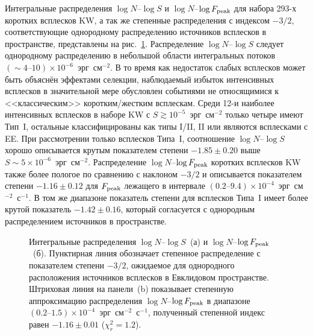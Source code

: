 Интегральные распределения $\log N$--$\log S$ и $\log N$--$\log F_{\mathrm{peak}}$
для набора 293-х коротких всплесков KW, а так же степенные распределения с индексом $-3/2$, 
соответствующие однородному распределению источников всплесков в пространстве,
представлены на рис.~\ref{fig:logNlogS_PF}.
Распределение $\log N$--$\log S$ следует однородному распределению в небольшой 
области интегральных потоков $(\sim 4\textrm{--}10)\times 10^{-6}$~эрг~см$^{-2}$.
В то время как недостаток слабых всплесков может быть объяснён эффектами селекции,
наблюдаемый избыток интенсивных всплесков в значительной мере обусловлен событиями 
не относящимися к <<классическим>> коротким/жестким всплескам. Среди 12-и наиболее 
интенсивных всплесков в наборе KW с $S \gtrsim 10^{-5}$~эрг~см$^{-2}$ только 
четыре имеют Тип~I, остальные классифицированы как типы I/II, II или являются всплесками с EE.
При рассмотрении только всплесков Типа~I, соотношение $\log N$--$\log S$ хорошо 
описывается крутым показателем степени $-1.85 \pm 0.20$ выше $S\sim 5\times 10^{-6}$~эрг~см$^{-2}$.
Распределение $\log N$--$\log F_{\mathrm{peak}}$ коротких всплесков KW также более пологое 
по сравнению с наклоном $-3/2$ и описывается показателем степени 
$-1.16 \pm 0.12$ для $F_{\mathrm{peak}}$ лежащего в интервале
$(0.2\textrm{--}9.4)\times 10^{-4}$~эрг~см$^{-2}$~с$^{-1}$.
В том же диапазоне показатель степени для всплесков Типа~I имеет более крутой показатель 
$-1.42 \pm 0.16$, который согласуется с однородным распределением источников в пространстве.

\begin{figure}
    \begin{minipage}[h]{0.5\textwidth}
    \end{minipage}
    \hfill
    \begin{minipage}[h]{0.5\textwidth}
	\end{minipage}
\caption{
    Интегральные распределения $\log N$--$\log S$~(а) и $\log N$--$\log F_{\mathrm{peak}}$~(б).
    Пунктирная линия обозначает степенное распределение с показателем степени $-3/2$,
    ожидаемое для однородного расположения источников всплесков в Евклидовом пространстве.
    Штриховая линия на панели~(b) показывает степенную аппроксимацию
    распределения $\log N$--$\log F_{\mathrm{peak}}$ в диапазоне  
    $(0.2\textrm{--}1.5)\times 10^{-4}$~эрг~см$^{-2}$~с$^{-1}$, полученный степенной индекс
    равен $-1.16\pm0.01$ ($\chi^2_r = 1.2$).
    \label{fig:logNlogS_PF} }
\end{figure}

